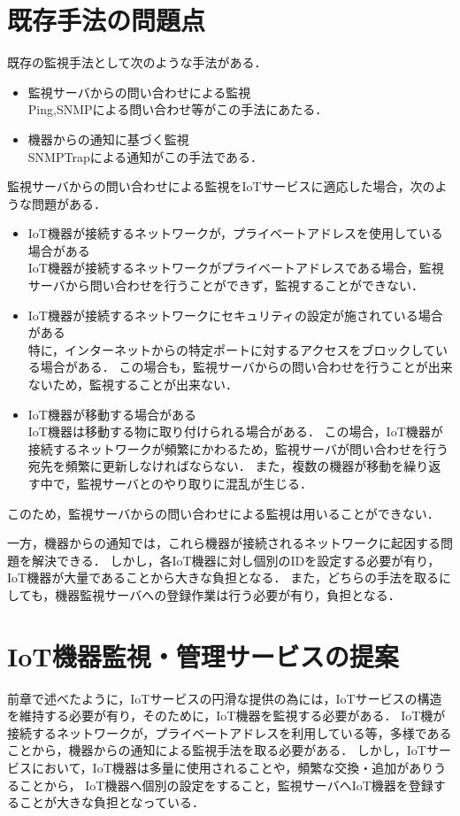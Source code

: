 \section{既存手法の問題点}
既存の監視手法として次のような手法がある．
\begin{itemize}
\item 監視サーバからの問い合わせによる監視\\
	Ping,SNMPによる問い合わせ等がこの手法にあたる．
\item 機器からの通知に基づく監視\\
	SNMPTrapによる通知がこの手法である．
\end{itemize}
\medskip

監視サーバからの問い合わせによる監視をIoTサービスに適応した場合，次のような問題がある．
\begin{itemize}
\item IoT機器が接続するネットワークが，プライベートアドレスを使用している場合がある\\
	IoT機器が接続するネットワークがプライベートアドレスである場合，監視サーバから問い合わせを行うことができず，監視することができない．
\item IoT機器が接続するネットワークにセキュリティの設定が施されている場合がある\\
	特に，インターネットからの特定ポートに対するアクセスをブロックしている場合がある．
	この場合も，監視サーバからの問い合わせを行うことが出来ないため，監視することが出来ない．
\item IoT機器が移動する場合がある\\
	IoT機器は移動する物に取り付けられる場合がある．
	この場合，IoT機器が接続するネットワークが頻繁にかわるため，監視サーバが問い合わせを行う宛先を頻繁に更新しなければならない．
	また，複数の機器が移動を繰り返す中で，監視サーバとのやり取りに混乱が生じる．
\end{itemize}
このため，監視サーバからの問い合わせによる監視は用いることができない．
\medskip

一方，機器からの通知では，これら機器が接続されるネットワークに起因する問題を解決できる．
しかし，各IoT機器に対し個別のIDを設定する必要が有り，IoT機器が大量であることから大きな負担となる．
また，どちらの手法を取るにしても，機器監視サーバへの登録作業は行う必要が有り，負担となる．

\section{IoT機器監視・管理サービスの提案}
前章で述べたように，IoTサービスの円滑な提供の為には，IoTサービスの構造を維持する必要が有り，そのために，IoT機器を監視する必要がある．
IoT機が接続するネットワークが，プライベートアドレスを利用している等，多様であることから，機器からの通知による監視手法を取る必要がある．
しかし，IoTサービスにおいて，IoT機器は多量に使用されることや，頻繁な交換・追加がありうることから，
IoT機器へ個別の設定をすること，監視サーバへIoT機器を登録することが大きな負担となっている．
\medskip

